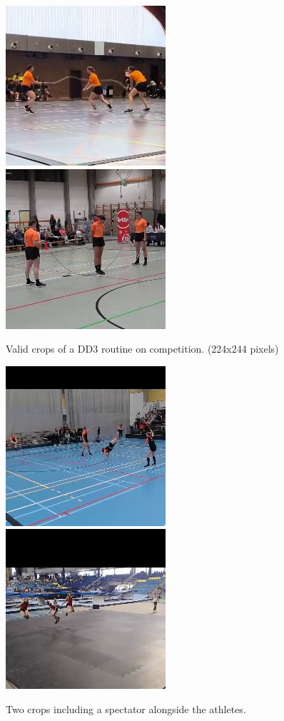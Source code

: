 \begin{figure}
    \centering
    \includegraphics[width=0.45\linewidth]{img/1315_2935}
    \includegraphics[width=0.45\linewidth]{img/2297_134}
    \caption[Valid crops of a DD3 routine on competition.]{Valid crops of a DD3 routine on competition. (224x244 pixels)}
    \label{fig:dd3-crop}
\end{figure}

\begin{figure}
    \centering
    \includegraphics[width=0.45\linewidth]{img/1267_292_cropped}
    \includegraphics[width=0.45\linewidth]{img/1405_1061_cropped}
    \caption[dd3-crop-error]{Two crops including a spectator alongside the athletes.}
    \label{fig:dd3-crop-error}
\end{figure}

